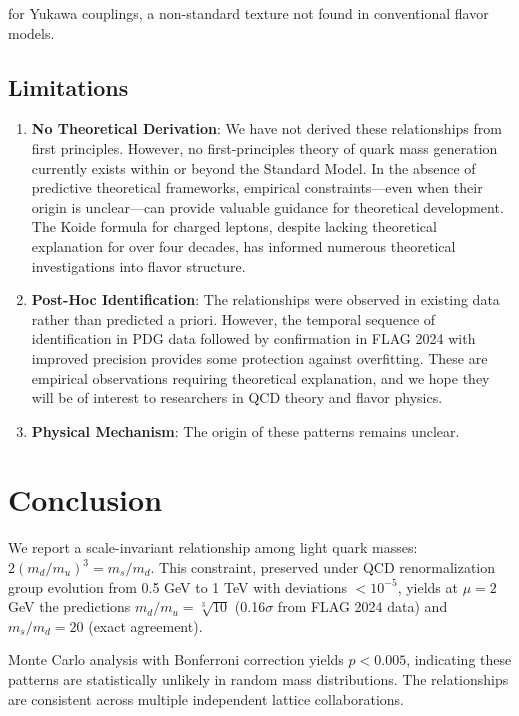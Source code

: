 \documentclass[12pt]{article}
\begin{document}
for Yukawa couplings, a non-standard texture not found in conventional flavor models.

\subsection{Limitations}

\begin{enumerate}
\item \textbf{No Theoretical Derivation}: We have not derived these relationships from first principles. However, no first-principles theory of quark mass generation currently exists within or beyond the Standard Model. In the absence of predictive theoretical frameworks, empirical constraints—even when their origin is unclear—can provide valuable guidance for theoretical development. The Koide formula for charged leptons, despite lacking theoretical explanation for over four decades, has informed numerous theoretical investigations into flavor structure.

\item \textbf{Post-Hoc Identification}: The relationships were observed in existing data rather than predicted a priori. However, the temporal sequence of identification in PDG data followed by confirmation in FLAG 2024 with improved precision provides some protection against overfitting. These are empirical observations requiring theoretical explanation, and we hope they will be of interest to researchers in QCD theory and flavor physics.

\item \textbf{Physical Mechanism}: The origin of these patterns remains unclear.
\end{enumerate}

\section{Conclusion}

We report a scale-invariant relationship among light quark masses: $2(m_d/m_u)^3 = m_s/m_d$. This constraint, preserved under QCD renormalization group evolution from 0.5 GeV to 1 TeV with deviations $<10^{-5}$, yields at $\mu=2$ GeV the predictions $m_d/m_u = \sqrt[3]{10}$ (0.16$\sigma$ from FLAG 2024 data) and $m_s/m_d = 20$ (exact agreement).

Monte Carlo analysis with Bonferroni correction yields $p < 0.005$, indicating these patterns are statistically unlikely in random mass distributions. The relationships are consistent across multiple independent lattice collaborations.
\end{document}
